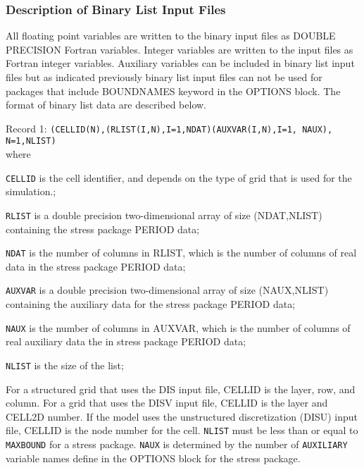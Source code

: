 \subsubsection{Description of Binary List Input Files}
All floating point variables are written to the binary input files as DOUBLE PRECISION Fortran variables. Integer variables are written to the input files as Fortran integer variables. Auxiliary variables can be included in binary list input files but as indicated previously binary list input files can not be used for packages that include BOUNDNAMES keyword in the OPTIONS block. The format of binary list data are described below.

\vspace{5mm}
\noindent Record 1: \texttt{(CELLID(N),(RLIST(I,N),I=1,NDAT)(AUXVAR(I,N),I=1, NAUX), N=1,NLIST)}\\

\noindent where

\begin{description} \itemsep0pt \parskip0pt 
\item \texttt{CELLID} is the cell identifier, and depends on the type of grid that is used for the simulation.;
\item \texttt{RLIST} is a double precision two-dimensional array of size (NDAT,NLIST) containing the stress package PERIOD data;
\item \texttt{NDAT} is the number of columns in RLIST, which is the number of columns of real data in the stress package PERIOD data;
\item \texttt{AUXVAR} is a double precision two-dimensional array of size (NAUX,NLIST)  containing the auxiliary data for the stress package PERIOD data;
\item \texttt{NAUX} is the number of columns in AUXVAR, which is the number of columns of real auxiliary data the in stress package PERIOD data;
\item \texttt{NLIST} is the size of the list;
\end{description}

\noindent For a structured grid that uses the DIS input file, CELLID is the layer, row, and column. For a grid that uses the DISV input file, CELLID is the layer and CELL2D number. If the model uses the unstructured discretization (DISU) input file, CELLID is the node number for the cell. \texttt{NLIST} must be less than or equal to \texttt{MAXBOUND} for a stress package. \texttt{NAUX} is determined by the number of \texttt{AUXILIARY} variable names define in the OPTIONS block for the stress package.
